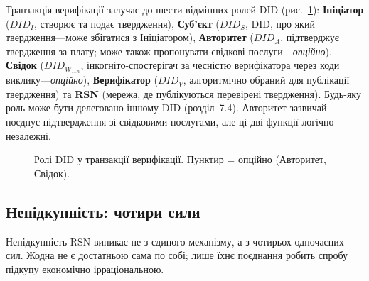 \documentclass[11pt,a4paper,twocolumn]{article}
\begin{document}
Транзакція верифікації залучає до шести відмінних ролей DID (рис.~\ref{fig:roles}): \textbf{Ініціатор} ($DID_I$, створює та подає твердження), \textbf{Суб'єкт} ($DID_S$, DID, про який твердження---може збігатися з Ініціатором), \textbf{Авторитет} ($DID_A$, підтверджує твердження за плату; може також пропонувати свідкові послуги---\emph{опційно}), \textbf{Свідок} ($DID_{W_{1..n}}$, інкогніто-спостерігач за чесністю верифікатора через коди виклику---\emph{опційно}), \textbf{Верифікатор} ($DID_V$, алгоритмічно обраний для публікації твердження) та \textbf{RSN} (мережа, де публікуються перевірені твердження). Будь-яку роль може бути делеговано іншому DID (розділ~7.4). Авторитет зазвичай поєднує підтвердження зі свідковими послугами, але ці дві функції логічно незалежні.

\begin{figure}[ht]
\centering
{}
\caption{Ролі DID у транзакції верифікації. Пунктир = опційно (Авторитет, Свідок).}
\label{fig:roles}
\end{figure}

\subsection{Непідкупність: чотири сили}

Непідкупність RSN виникає не з єдиного механізму, а з чотирьох одночасних сил. Жодна не є достатньою сама по собі; лише їхнє поєднання робить спробу підкупу економічно ірраціональною.
\end{document}
